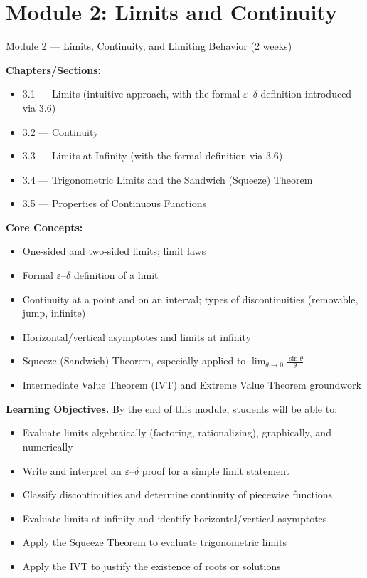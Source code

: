 \documentclass[11pt]{article}
\newcommand{\loheader}{\textbf{Learning Objectives.} By the end of this module, students will be able to:}
\begin{document}
\section{Module 2: Limits and Continuity}
\label{mod:2}
\begin{modulebox}{Module 2 --- Limits, Continuity, and Limiting Behavior \hfill (2 weeks)}

\textbf{Chapters/Sections:}
\begin{itemize}[nosep]
  \item 3.1 --- Limits (intuitive approach, with the formal $\varepsilon$--$\delta$ definition introduced via 3.6)
  \item 3.2 --- Continuity
  \item 3.3 --- Limits at Infinity (with the formal definition via 3.6)
  \item 3.4 --- Trigonometric Limits and the Sandwich (Squeeze) Theorem
  \item 3.5 --- Properties of Continuous Functions
\end{itemize}

\textbf{Core Concepts:}
\begin{itemize}[nosep]
  \item One-sided and two-sided limits; limit laws
  \item Formal $\varepsilon$--$\delta$ definition of a limit
  \item Continuity at a point and on an interval; types of discontinuities (removable, jump, infinite)
  \item Horizontal/vertical asymptotes and limits at infinity
  \item Squeeze (Sandwich) Theorem, especially applied to $\lim_{\theta \to 0}\frac{\sin\theta}{\theta}$
  \item Intermediate Value Theorem (IVT) and Extreme Value Theorem groundwork
\end{itemize}

\loheader
\begin{itemize}[nosep]
  \item Evaluate limits algebraically (factoring, rationalizing), graphically, and numerically
  \item Write and interpret an $\varepsilon$--$\delta$ proof for a simple limit statement
  \item Classify discontinuities and determine continuity of piecewise functions
  \item Evaluate limits at infinity and identify horizontal/vertical asymptotes
  \item Apply the Squeeze Theorem to evaluate trigonometric limits
  \item Apply the IVT to justify the existence of roots or solutions
\end{itemize}
\end{modulebox}
\end{document}
